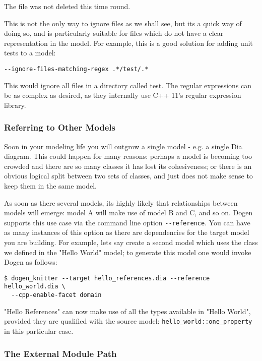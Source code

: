 \documentclass[11pt]{article}
\begin{document}
The file was not deleted this time round.

This is not the only way to ignore files as we shall see, but its a
quick way of doing so, and is particularly suitable for files which
do not have a clear representation in the model. For example, this is
a good solution for adding unit tests to a model:

\begin{verbatim}
--ignore-files-matching-regex .*/test/.*
\end{verbatim}

This would ignore all files in a directory called test. The regular
expressions can be as complex as desired, as they internally use C++
11's regular expression library.

\subsubsection{Referring to Other Models}
\label{sec-3-2-9}

Soon in your modeling life you will outgrow a single model - e.g. a
single Dia diagram. This could happen for many reasons: perhaps a
model is becoming too crowded and there are so many classes it has
lost its cohesiveness; or there is an obvious logical split between
two sets of classes, and just does not make sense to keep them in the
same model.

As soon as there several models, its highly likely that relationships
between models will emerge: model A will make use of model B and C,
and so on. Dogen supports this use case via the command line option
\texttt{-{}-reference}. You can have as many instances of this option as there
are dependencies for the target model you are building. For example,
lets say create a second model which uses the class we defined in the
"Hello World" model; to generate this model one would invoke Dogen as
follows:

\begin{verbatim}
$ dogen_knitter --target hello_references.dia --reference hello_world.dia \
  --cpp-enable-facet domain
\end{verbatim}

"Hello References" can now make use of all the types available in
"Hello World", provided they are qualified with the source model:
\texttt{hello\_world::one\_property} in this particular case.

\subsubsection{The External Module Path}
\label{sec-3-2-10}
\end{document}
